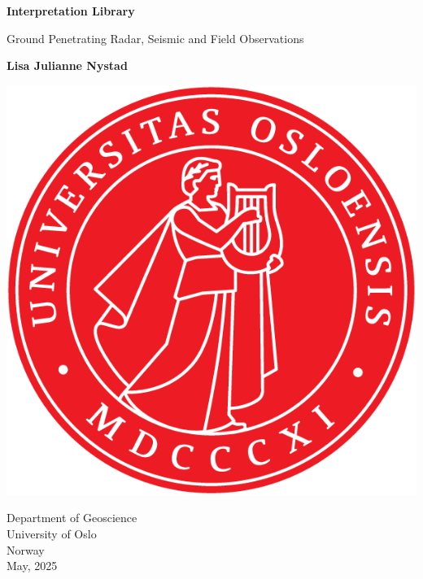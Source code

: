 
\usepackage[utf8]{inputenc}
\usepackage{babel}


\begin{titlepage}
    \begin{center}
     \vspace*{1cm}
     \Huge
       \textbf{Interpretation Library}
       
       
       \vspace{0.5cm}
       \LARGE
        Ground Penetrating Radar, Seismic and Field Observations
        \normalsize
    
       \vspace{1.5cm}
    
       \textbf{Lisa Julianne Nystad}

       \vfill

        \vfill
        \begin{center}
        \includegraphics[width=0.4\linewidth]{0.1Main/DUO_UiO_segl.png}
        \label{fig:your-figure-label}
        \end{center}
        \vfill
      \vfill
            
       Department of Geoscience\\
       University of Oslo\\
       Norway\\
       May, 2025   
    \end{center}
\end{titlepage}



\cfoot{\thepage}


\renewcommand{\figurename}{Fig.} %
\renewcommand{\listfigurename}{List of Figures} %


\tableofcontents
\setcounter{page}{2} %
\newpage
\listoffigures
\newpage














\newpage


